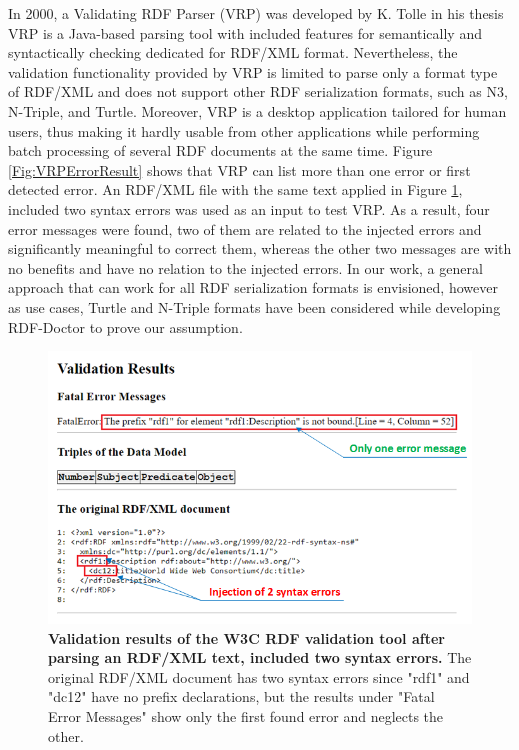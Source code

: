 In 2000, a Validating RDF Parser (VRP) \cite{karsten:Thesis:2000} was developed by K. Tolle in his thesis
VRP is a Java-based parsing tool with included features for semantically and syntactically checking dedicated for RDF/XML format. 
Nevertheless, the validation functionality provided by VRP is limited to parse only a format type of RDF/XML and does not support other RDF serialization formats, such as N3, N-Triple, and Turtle. 
Moreover, VRP is a desktop application tailored for human users, thus making it hardly usable from other applications while performing batch processing of several RDF documents at the same time.
Figure \ref{Fig:VRPErrorResult} shows that VRP can list more than one error or first detected error. 
An RDF/XML file with the same text applied in Figure \ref{Fig:errorW3RDFValidator}, included two syntax errors was used as an input to test VRP. 
As a result, four error messages were found, two of them are related to the injected errors and significantly meaningful to correct them, whereas the other two messages are with no benefits and have no relation to the injected errors. 
In our work, a general approach that can work for all RDF serialization formats is envisioned, however as use cases, Turtle and N-Triple formats have been considered while developing RDF-Doctor to prove our assumption. 
 
 \begin{figure}[ht]
		\begin{center}
			\setlength\belowcaptionskip{-7mm}
			\includegraphics[scale=0.8,angle=0]{images/errorW3RDFValidator.png}
			\caption{\textbf{Validation results of the W3C RDF validation tool \cite{W3C:Validation:Online} after parsing an RDF/XML text, included two syntax errors.} The original RDF/XML document has two syntax errors since "rdf1" and "dc12" have no prefix declarations, but the results under "Fatal Error Messages" show only the first found error and neglects the other.}
			\label{Fig:errorW3RDFValidator}
		\end{center}
	\end{figure}
